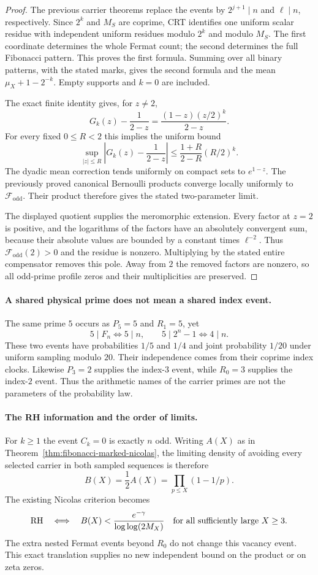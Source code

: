 \documentclass[11pt]{article}
\theoremstyle{definition}
\begin{document}
\begin{proof}
The previous carrier theorems replace the events by
$2^{j+1}\mid n$ and $\ell\mid n$, respectively.
Since $2^k$ and $M_S$ are coprime, CRT identifies one uniform
scalar residue with independent uniform residues modulo $2^k$
and modulo $M_S$. The first coordinate determines the whole
Fermat count; the second determines the full Fibonacci pattern.
This proves the first formula. Summing over all binary patterns,
with the stated marks, gives the second formula and the mean
$\mu_X+1-2^{-k}$. Empty supports and $k=0$ are included.

The exact finite identity gives, for $z\ne2$,
\[
 G_k(z)-\frac1{2-z}
 =\frac{(1-z)(z/2)^k}{2-z}.
\]
For every fixed $0\le R<2$ this implies the uniform bound
\[
 \sup_{|z|\le R}\left|G_k(z)-\frac1{2-z}\right|
 \le \frac{1+R}{2-R}(R/2)^k.
\]
The dyadic mean correction tends uniformly on compact sets to
$e^{1-z}$. The previously proved canonical Bernoulli products
converge locally uniformly to $\mathcal F_{\mathrm{odd}}$.
Their product therefore gives the stated two-parameter limit.

The displayed quotient supplies the meromorphic extension.
Every factor at $z=2$ is positive, and the logarithms of the
factors have an absolutely convergent sum, because their
absolute values are bounded by a constant times $\ell^{-2}$.
Thus $\mathcal F_{\mathrm{odd}}(2)>0$ and the residue is nonzero.
Multiplying by the stated entire compensator removes this pole.
Away from $2$ the removed factors are nonzero, so all odd-prime
profile zeros and their multiplicities are preserved.
\end{proof}

\paragraph{A shared physical prime does not mean a shared index event.}
The same prime $5$ occurs as $P_5=5$ and $R_1=5$, yet
\[
 5\mid F_n\Longleftrightarrow5\mid n,\qquad
 5\mid2^n-1\Longleftrightarrow4\mid n.
\]
These two events have probabilities $1/5$ and $1/4$ and joint
probability $1/20$ under uniform sampling modulo $20$.
Their independence comes from their coprime index clocks.
Likewise $P_3=2$ supplies the index-$3$ event, while $R_0=3$
supplies the index-$2$ event. Thus the arithmetic names of the
carrier primes are not the parameters of the probability law.

\paragraph{The RH information and the order of limits.}
For $k\ge1$ the event $C_k=0$ is exactly $n$ odd.
Writing $A(X)$ as in Theorem~\ref{thm:fibonacci-marked-nicolas},
the limiting density of avoiding every selected carrier in both
sampled sequences is therefore
\[
 B(X)=\frac12 A(X)=\prod_{p\le X}(1-1/p).
\]
The existing Nicolas criterion becomes
\[
 \mathrm{RH}\quad\Longleftrightarrow\quad
 B(X)<\frac{e^{-\gamma}}{\log\log(2M_X)}
 \quad\hbox{for all sufficiently large }X\ge3.
\]
The extra nested Fermat events beyond $R_0$ do not change this
vacancy event. This exact translation supplies no new independent
bound on the product or on zeta zeros.
\end{document}
